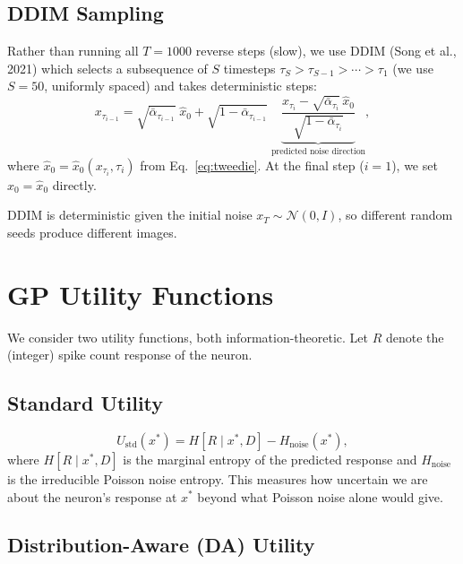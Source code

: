 \documentclass[11pt]{article}
\newcommand{\N}{\mathcal{N}}
\begin{document}
\subsection{DDIM Sampling}

Rather than running all $T = 1000$ reverse steps (slow), we use DDIM
(Song et al., 2021) which selects a subsequence of $S$ timesteps
$\tau_S > \tau_{S-1} > \cdots > \tau_1$ (we use $S = 50$, uniformly spaced)
and takes deterministic steps:
\begin{equation}\label{eq:ddim}
  x_{\tau_{i-1}}
  = \sqrt{\bar\alpha_{\tau_{i-1}}}\; \hat x_0
  + \sqrt{1 - \bar\alpha_{\tau_{i-1}}}\;
    \underbrace{\frac{x_{\tau_i} - \sqrt{\bar\alpha_{\tau_i}}\, \hat x_0}
    {\sqrt{1 - \bar\alpha_{\tau_i}}}}_{\text{predicted noise direction}},
\end{equation}
where $\hat x_0 = \hat x_0(x_{\tau_i}, \tau_i)$ from Eq.~\eqref{eq:tweedie}.
At the final step ($i = 1$), we set $x_0 = \hat x_0$ directly.

DDIM is deterministic given the initial noise $x_T \sim \N(0, I)$, so different
random seeds produce different images.


\section{GP Utility Functions}

We consider two utility functions, both information-theoretic.
Let $R$ denote the (integer) spike count response of the neuron.

\subsection{Standard Utility}

\begin{equation}\label{eq:utility_standard}
  U_{\text{std}}(x^*)
  = H[R \mid x^*, D]
  - H_{\text{noise}}(x^*),
\end{equation}
where $H[R \mid x^*, D]$ is the marginal entropy of the predicted response
and $H_{\text{noise}}$ is the irreducible Poisson noise entropy.
This measures how uncertain we are about the neuron's response at $x^*$
beyond what Poisson noise alone would give.

\subsection{Distribution-Aware (DA) Utility}
\end{document}
